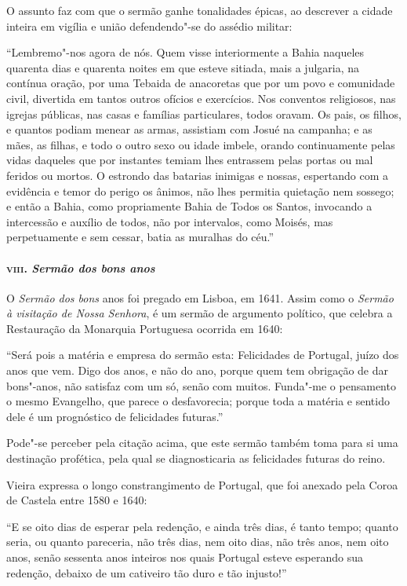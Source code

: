 O assunto faz com que o sermão ganhe tonalidades épicas, ao descrever a
cidade inteira em vigília e união defendendo"-se do assédio militar:

``Lembremo"-nos agora de nós. Quem visse interiormente a Bahia naqueles
quarenta dias e quarenta noites em que esteve sitiada, mais a julgaria,
na contínua oração, por uma Tebaida de anacoretas que por um povo e
comunidade civil, divertida em tantos outros ofícios e exercícios. Nos
conventos religiosos, nas igrejas públicas, nas casas e famílias
particulares, todos oravam. Os pais, os filhos, e quantos podiam menear
as armas, assistiam com Josué na campanha; e as mães, as filhas, e todo
o outro sexo ou idade imbele, orando continuamente pelas vidas daqueles
que por instantes temiam lhes entrassem pelas portas ou mal feridos ou
mortos. O estrondo das batarias inimigas e nossas, espertando com a
evidência e temor do perigo os ânimos, não lhes permitia quietação nem
sossego; e então a Bahia, como propriamente Bahia de Todos os Santos,
invocando a intercessão e auxílio de todos, não por intervalos, como
Moisés, mas perpetuamente e sem cessar, batia as muralhas do céu.''

\paragraph{\textsc{viii}. \emph{Sermão dos bons anos}}

O \emph{Sermão dos bons} anos foi pregado em Lisboa, em 1641. Assim como
o \emph{Sermão à visitação de Nossa Senhora}, é um sermão de argumento
político, que celebra a Restauração da Monarquia Portuguesa ocorrida em
1640:

``Será pois a matéria e empresa do sermão esta: Felicidades de Portugal,
juízo dos anos que vem. Digo dos anos, e não do ano, porque quem tem
obrigação de dar bons"-anos, não satisfaz com um só, senão com muitos.
Funda"-me o pensamento o mesmo Evangelho, que parece o desfavorecia;
porque toda a matéria e sentido dele é um prognóstico de felicidades
futuras.''

Pode"-se perceber pela citação acima, que este sermão também toma para si
uma destinação profética, pela qual se diagnosticaria as felicidades
futuras do reino.

Vieira expressa o longo constrangimento de Portugal, que foi anexado
pela Coroa de Castela entre 1580 e 1640:

``E se oito dias de esperar pela redenção, e ainda três dias, é tanto
tempo; quanto seria, ou quanto pareceria, não três dias, nem oito dias,
não três anos, nem oito anos, senão sessenta anos inteiros nos quais
Portugal esteve esperando sua redenção, debaixo de um cativeiro tão duro
e tão injusto!''

